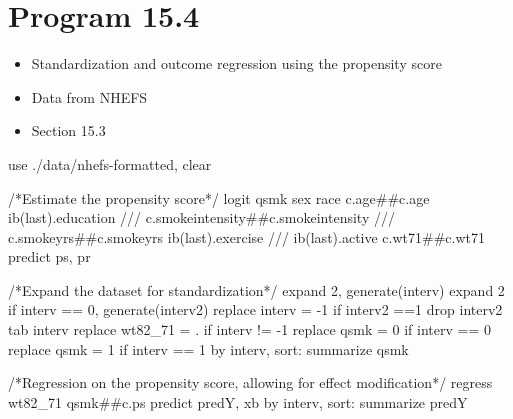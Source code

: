 \documentclass[
  10pt,
  a4paper,
]{book}
\newenvironment{Shaded}{\begin{snugshade}}{\end{snugshade}}
\newcommand{\CommentTok}[1]{\textcolor[rgb]{0.37,0.37,0.37}{#1}}
\newcommand{\FunctionTok}[1]{\textcolor[rgb]{0.28,0.35,0.67}{#1}}
\newcommand{\KeywordTok}[1]{\textcolor[rgb]{0.00,0.46,0.62}{#1}}
\newcommand{\NormalTok}[1]{\textcolor[rgb]{0.00,0.46,0.62}{#1}}
\providecommand{\tightlist}{%
  \setlength{\itemsep}{0pt}\setlength{\parskip}{0pt}}
\begin{document}
\hypertarget{program-15.4-1}{%
\section{Program 15.4}\label{program-15.4-1}}

\begin{itemize}
\tightlist
\item
  Standardization and outcome regression using the propensity score
\item
  Data from NHEFS
\item
  Section 15.3
\end{itemize}

\begin{Shaded}
\begin{Highlighting}[]
\KeywordTok{use}\NormalTok{ ./}\KeywordTok{data}\NormalTok{/nhefs{-}formatted, }\KeywordTok{clear}

\CommentTok{/*Estimate the propensity score*/}
\KeywordTok{logit}\NormalTok{ qsmk sex race c.age\#\#c.age ib(}\FunctionTok{last}\NormalTok{).education }\CommentTok{///}
\NormalTok{  c.smokeintensity\#\#c.smokeintensity }\CommentTok{///}
\NormalTok{  c.smokeyrs\#\#c.smokeyrs ib(}\FunctionTok{last}\NormalTok{).exercise }\CommentTok{///}
\NormalTok{  ib(}\FunctionTok{last}\NormalTok{).active c.wt71\#\#c.wt71 }
\KeywordTok{predict}\NormalTok{ ps, pr}

\CommentTok{/*Expand the dataset for standardization*/}
\NormalTok{expand 2, }\KeywordTok{generate}\NormalTok{(interv)}
\NormalTok{expand 2 }\KeywordTok{if}\NormalTok{ interv == 0, }\KeywordTok{generate}\NormalTok{(interv2)}
\KeywordTok{replace}\NormalTok{ interv = {-}1 }\KeywordTok{if}\NormalTok{ interv2 ==1}
\KeywordTok{drop}\NormalTok{ interv2 }
\KeywordTok{tab}\NormalTok{ interv}
\KeywordTok{replace}\NormalTok{ wt82\_71 = . }\KeywordTok{if}\NormalTok{ interv != {-}1}
\KeywordTok{replace}\NormalTok{ qsmk = 0 }\KeywordTok{if}\NormalTok{ interv == 0}
\KeywordTok{replace}\NormalTok{ qsmk = 1 }\KeywordTok{if}\NormalTok{ interv == 1}
\KeywordTok{by}\NormalTok{ interv, }\KeywordTok{sort}\NormalTok{: }\KeywordTok{summarize}\NormalTok{ qsmk}

\CommentTok{/*Regression on the propensity score, allowing for effect modification*/}
\KeywordTok{regress}\NormalTok{ wt82\_71 qsmk\#\#c.ps}
\KeywordTok{predict}\NormalTok{ predY, }\KeywordTok{xb}
\KeywordTok{by}\NormalTok{ interv, }\KeywordTok{sort}\NormalTok{: }\KeywordTok{summarize}\NormalTok{ predY}


\end{Highlighting}
\end{Shaded}
\end{document}
